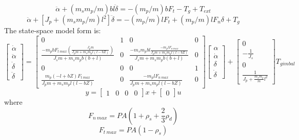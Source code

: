\documentclass[]{aiaa-tc}%
\begin{document}
\begin{equation}
[J_s+(m_sm_p/m)b(b+l)]\ddot{\alpha}+(m_sm_p/m)bl\ddot{\delta}=-(m_p/m)bF_t-T_g+T_{ext}
\end{equation}
\begin{equation}
[J_p+(m_sm_p/m)l(b+l)]\ddot{\alpha}+[J_p+(m_sm_p/m)l^2]\ddot{\delta}=-(m_p/m)lF_t+(m_p/m)lF_n\delta+T_g
\end{equation}
The state-space model form is:
	\begin{equation}
\begin{bmatrix}
\dot{\alpha }\\ 
\ddot{\alpha}\\ 
\dot{\delta }\\ 
\ddot{\delta }
\end{bmatrix}=\begin{bmatrix}
0 & 1 & 0 & 0\\ 
\frac{-m_pbF_{t\ max}(\frac{J_pm}{J_pm + {m_sm_p}l(l-bZ)})}{J_sm + m_sm_pb(b+l)} & 0 & \frac{-m_sm_pbl\frac{-m_plF_{n\ max}}{J_pm + {m_sm_p}l(l-bZ)}}{J_sm + m_sm_pb(b+l)} & 0\\ 
0 & 0 & 0 & 1\\ 
\frac{{m_p}(-l+bZ)F_{t\ max}}{J_pm + {m_sm_p}l(l-bZ)} & 0 & \frac{-m_plF_{n\ max}}{J_pm + {m_sm_p}l(l-bZ)} & 0
\end{bmatrix}
\begin{bmatrix}
\alpha\\ 
\dot{\alpha}\\ 
\delta\\ 
\dot{\delta }
\end{bmatrix}
+
\begin{bmatrix}
0\\ 
-\frac{1}{J_s}\\ 
0\\ 
\frac{1}{J_p+\frac{m_sm_p}{m}l^{2}}
\end{bmatrix}T_{gimbal}
	\end{equation}
	\begin{equation}
y = \begin{bmatrix}
1 & 0 & 0 & 0
\end{bmatrix}x+\begin{bmatrix}
0
\end{bmatrix}u
	\end{equation}
\noindent
where
	\begin{equation}
F_{n\ max}=PA(1+\rho_s+\frac{2}{3}\rho_d)
	\end{equation}
	\begin{equation}
F_{t\ max}=PA(1-\rho_s)
	\end{equation}
\end{document}
